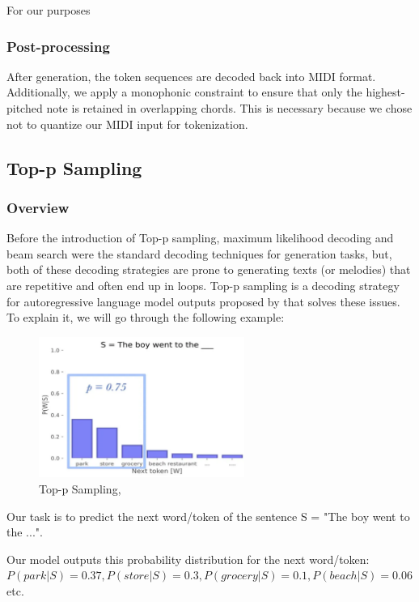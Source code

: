 \documentclass[a4paper,12pt]{extarticle}
\begin{document}
For our purposes

\subsubsection{Post-processing}
After generation, the token sequences are decoded back into MIDI format. Additionally, we apply a monophonic constraint to ensure that only the highest-pitched note is retained in overlapping chords.
This is necessary because we chose not to quantize our MIDI input for tokenization.

\subsection{Top-p Sampling}
\label{sec:6_9}
\subsubsection{Overview}

Before the introduction of Top-p sampling, maximum likelihood decoding and beam search were the standard decoding techniques for generation tasks, but, both of these decoding strategies are prone to generating texts (or melodies) that are repetitive and often end up in loops. Top-p sampling is a decoding strategy for autoregressive language model outputs proposed by \textcite{holtzman2020curiouscaseneuraltext} that solves these issues. To explain it, we will go through the following example:

\begin{figure}[H] %
    \centering
    \includegraphics[width=0.6\textwidth]{top p.png} %
    \caption{Top-p Sampling, \textcite{TopPWebsite}}
    \label{fig:topp}
\end{figure}

Our task is to predict the next word/token of the sentence S = "The boy went to the ...".

Our model outputs this probability distribution for the next word/token:
$P(park|S) = 0.37, P(store|S) = 0.3, P(grocery|S) = 0.1, P(beach|S) = 0.06$ etc. \newline
\end{document}
